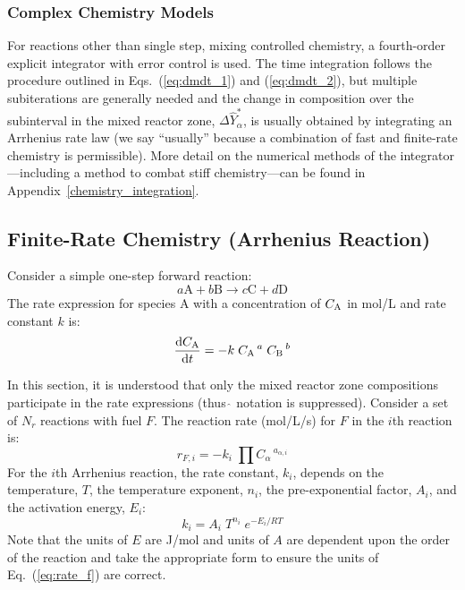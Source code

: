 \subsubsection{Complex Chemistry Models}

For reactions other than single step, mixing controlled chemistry, a fourth-order explicit integrator with error control is used. The time integration follows the procedure outlined in Eqs.~(\ref{eq:dmdt_1}) and (\ref{eq:dmdt_2}), but multiple subiterations are generally needed and the change in composition over the subinterval in the mixed reactor zone, $\Delta \hat{Y}_\alpha^*$, is usually obtained by integrating an Arrhenius rate law (we say ``usually'' because a combination of fast and finite-rate chemistry is permissible). More detail on the numerical methods of the integrator---including a method to combat stiff chemistry---can be found in Appendix~\ref{chemistry_integration}.

\subsection{Finite-Rate Chemistry (Arrhenius Reaction)}
\label{Reaction_Rate_Model}
Consider a simple one-step forward reaction:
\begin{equation}\label{eq:generic_1step}
a\mathrm{A} + b\mathrm{B} \rightarrow c\mathrm{C} + d\mathrm{D}
\end{equation}
The rate expression for species A with a concentration of $C_{\mbox{\scriptsize A}}$ in mol/L and rate constant $k$ is:
\begin{equation}\label{eq:generic_rate}
\frac{\mbox{d}C_{\mbox{\scriptsize A}}}{\mbox{d}t}= -k\; C_{\mbox{\scriptsize A}}\,^{a}\; C_{\mbox{\scriptsize B}}\,^{b}
\end{equation}

In this section, it is understood that only the mixed reactor zone compositions participate in the rate expressions (thus $\hat{\,}$ notation is suppressed). Consider a set of $N_r$ reactions with fuel $F$. The reaction rate (mol/L/s) for $F$ in the $i$th reaction is:
\begin{equation}\label{eq:rate_f}
r_{F,i}= -k_{i}\; \prod C_{\alpha}\,^{a_{\alpha,i}}
\end{equation}
For the $i$th Arrhenius reaction, the rate constant, $k_i$, depends on the temperature, $T$, the temperature exponent, $n_i$, the pre-exponential factor, $A_i$, and the activation energy, $E_i$:
\begin{equation}\label{eq:rate_cons}
k_i = A_i\;T^{n_i}\;e^{-E_i/RT}
\end{equation}
Note that the units of $E$ are J/mol and units of $A$ are dependent upon the order of the reaction and take the appropriate form to ensure the units of Eq.~(\ref{eq:rate_f}) are correct.

